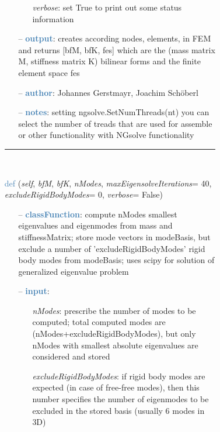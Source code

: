 \begin{itemize}[leftmargin=1.4cm]
\begin{itemize}[leftmargin=1.4cm]
\begin{itemize}[leftmargin=0.5cm]
\begin{itemize}[leftmargin=1.4cm]
\begin{itemize}[leftmargin=1.4cm]
\begin{itemize}[leftmargin=0.5cm]
\begin{itemize}[leftmargin=0.7cm]
\begin{itemize}[leftmargin=1.2cm]
\item[]{\it verbose}: set True to print out some status information
\end{itemize}
\item[--]\textcolor{steelblue}{\bf output}: creates according nodes, elements, in FEM and returns [bfM, bfK, fes] which are the (mass matrix M, stiffness matrix K) bilinear forms and the finite element space fes
\item[--]\textcolor{steelblue}{\bf author}: Johannes Gerstmayr, Joachim Sch\"oberl
\item[--]\textcolor{steelblue}{\bf notes}: setting ngsolve.SetNumThreads(nt) you can select the number of treads that are used for assemble or other functionality with NGsolve functionality
\vspace{12pt}\end{itemize}
%
\noindent\rule{8cm}{0.75pt}\vspace{1pt} \\ 
\begin{flushleft}
\noindent \textcolor{steelblue}{def {\bf {}}}\label{sec:FEM:FEMinterface:ComputeEigenmodesNGsolve}
({\it self}, {\it bfM}, {\it bfK}, {\it nModes}, {\it maxEigensolveIterations}= 40, {\it excludeRigidBodyModes}= 0, {\it verbose}= False)
\end{flushleft}
\setlength{\itemindent}{0.7cm}
\begin{itemize}[leftmargin=0.7cm]
\item[--]\textcolor{steelblue}{\bf classFunction}: compute nModes smallest eigenvalues and eigenmodes from mass and stiffnessMatrix; store mode vectors in modeBasis, but exclude a number of 'excludeRigidBodyModes' rigid body modes from modeBasis; uses scipy for solution of generalized eigenvalue problem
\item[--]\textcolor{steelblue}{\bf input}: \vspace{-6pt}
\begin{itemize}[leftmargin=1.2cm]
\setlength{\itemindent}{-0.7cm}
\item[]{\it nModes}: prescribe the number of modes to be computed; total computed modes are  (nModes+excludeRigidBodyModes), but only nModes with smallest absolute eigenvalues are considered and stored
\item[]{\it excludeRigidBodyModes}: if rigid body modes are expected (in case of free-free modes), then this number specifies the number of eigenmodes to be excluded in the stored basis (usually 6 modes in 3D)

\end{itemize}
\end{itemize}
\end{itemize}
\end{itemize}
\end{itemize}
\end{itemize}
\end{itemize}
\end{itemize}
